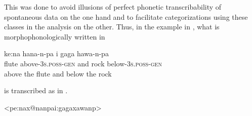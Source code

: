 \documentclass[output=paper]{LSP/langsci}
\begin{document}

This was done to avoid illusions of perfect phonetic transcribability of spontaneous data on the one hand and to facilitate categorizations using these classes in the analysis on the other. Thus, in the example in , what is morphophonologically written in 

\ea
\label{ex:buc:6}
\gll ke\textipa:na hana-n-pa i  gaga hawa-n-pa\\
flute above-\textsc{3s}.\textsc{poss}-\textsc{gen} and rock below-\textsc{3s}.\textsc{poss}-\textsc{gen}\\
\glt above the flute and below the rock
\z

\noindent is transcribed as in .

\ea
\label{ex:buc:7}
\ttfamily  <pe\textipa:{\textbar}na{\textbar}x@{\textbar}nan{\textbar}pa{\textbar}i\textipa:{\textbar}ga{\textbar}ga{\textbar}xa{\textbar}wanp>
\z
\end{document}
